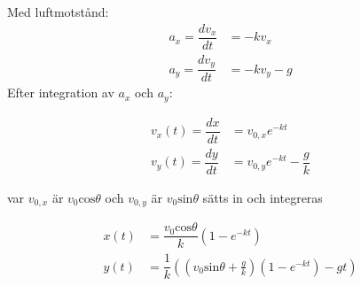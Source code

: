 \np 
Med luftmotstånd: 
\begin{align}
    a_x = \dfrac{dv_x}{dt} &= -kv_x \label{eq:2b_ax}\\
    a_y = \dfrac{dv_y}{dt} &= -kv_y -g \label{eq:2b_ay}
\end{align}
Efter integration av $a_x$ och $a_y$:


\begin{align} 
    v_x(t) = \dfrac{dx}{dt} &= v_{0,x}e^{-kt} \label{eq:2b_vx} \\ 
    v_y(t) = \dfrac{dy}{dt} &= v_{0,y}e^{-kt}- \dfrac{g}{k}
    \label{eq:2b_vy}
\end{align}

var $v_{0,x}$ är $v_0 \text{cos}\theta$  och  $v_{0,y}$ är $v_0 \text{sin}\theta$ sätts in och integreras

\begin{align} 
    x(t) &= \dfrac{v_0 \text{cos}\theta}{k}\left( 1-e^{-kt} \right) \\
    y(t) &= \dfrac{1}{k}\left( \left(v_0\text{sin}\theta + \frac{g}{k}\right)(1-e^{-kt}) -gt \right) \label{eq:2b_y}
\end{align}